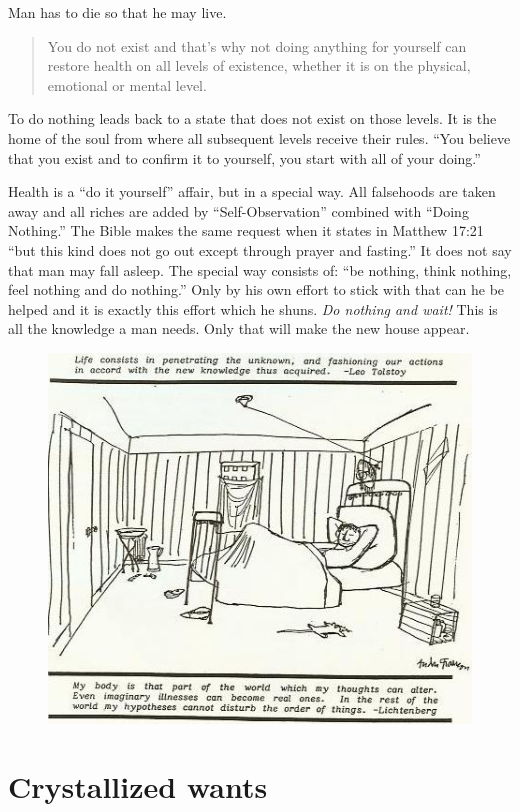 \documentclass[landscape,twocolumn,letterpaper]{article}
\begin{document}
Man has to die so that he may live.
\begin{quote} You do not exist and that's why not doing anything for
yourself can restore health on all levels of existence, whether it is
on the physical, emotional or mental level.
\end{quote} To do nothing leads back to a state that does not exist on
those levels. It is the home of the soul from where all subsequent
levels receive their rules. ``You believe that you exist and to
confirm it to yourself, you start with all of your doing.''

Health is a ``do it yourself'' affair, but in a special way. All
falsehoods are taken away and all riches are added by
``Self-Observation'' combined with ``Doing Nothing.'' The Bible makes
the same request when it states in Matthew 17:21 ``but this kind does
not go out except through prayer and fasting.'' It does not say that
man may fall asleep. The special way consists of: ``be nothing, think
nothing, feel nothing and do nothing.'' Only by his own effort to
stick with that can he be helped and it is exactly this effort which
he shuns. \emph{Do nothing and wait!} This is all the knowledge a man
needs. Only that will make the new house appear.

\begin{figure} \centering
  \includegraphics[height=0.325\textheight,bb= 0 0 453 396]{p29.jpg}
\end{figure}


\section{Crystallized wants}
\label{sec:cw}
\end{document}
